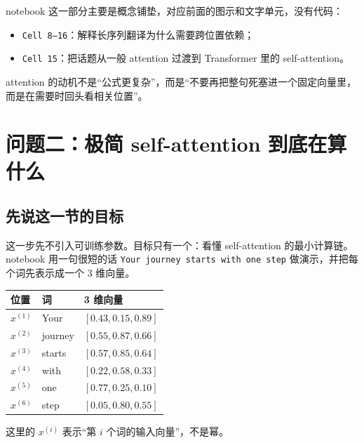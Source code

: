 \documentclass[11pt,a4paper]{ctexart}
\begin{document}
\begin{codeblock}
notebook 这一部分主要是概念铺垫，对应前面的图示和文字单元，没有代码：
\begin{itemize}
  \item \texttt{Cell 8--16}：解释长序列翻译为什么需要跨位置依赖；
  \item \texttt{Cell 15}：把话题从一般 attention 过渡到 Transformer 里的 self-attention。
\end{itemize}
\end{codeblock}

\begin{keypointblock}
attention 的动机不是“公式更复杂”，而是“不要再把整句死塞进一个固定向量里，而是在需要时回头看相关位置”。
\end{keypointblock}

\section{问题二：极简 self-attention 到底在算什么}

\subsection{先说这一节的目标}

\begin{problemblock}
这一步先不引入可训练参数。目标只有一个：看懂 self-attention 的最小计算链。notebook 用一句很短的话 \texttt{Your journey starts with one step} 做演示，并把每个词先表示成一个 3 维向量。
\end{problemblock}

\begin{center}
\begin{tabular}{lll}
\toprule
位置 & 词 & 3 维向量 \\
\midrule
\(x^{(1)}\) & Your & \([0.43, 0.15, 0.89]\) \\
\(x^{(2)}\) & journey & \([0.55, 0.87, 0.66]\) \\
\(x^{(3)}\) & starts & \([0.57, 0.85, 0.64]\) \\
\(x^{(4)}\) & with & \([0.22, 0.58, 0.33]\) \\
\(x^{(5)}\) & one & \([0.77, 0.25, 0.10]\) \\
\(x^{(6)}\) & step & \([0.05, 0.80, 0.55]\) \\
\bottomrule
\end{tabular}
\end{center}

这里的 \(x^{(i)}\) 表示“第 \(i\) 个词的输入向量”，不是幂。
\end{document}

